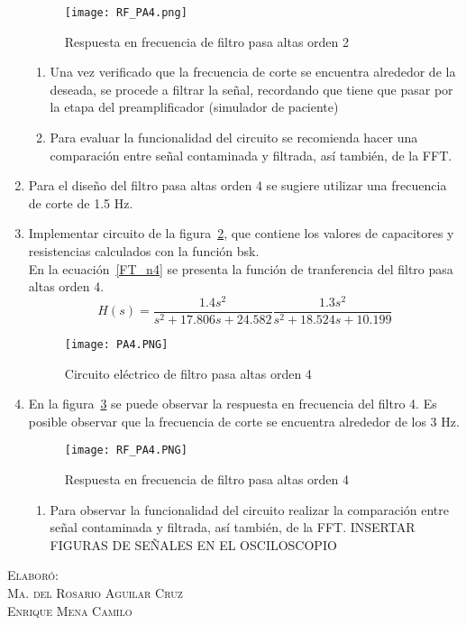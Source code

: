 \documentclass[10pt,letterpaper,spanish,twoside]{report}
\begin{document}
\begin{enumerate}
  \begin{figure}[H]
 	\centering
 	\texttt{[image: RF\_PA4.png]}
 	\caption{Respuesta en frecuencia de filtro pasa altas orden 2}
	\label{contexto:RF_2}
 \end{figure}
 \begin{enumerate}
  \item Una vez verificado que la frecuencia de corte se encuentra alrededor de la deseada, se procede a filtrar la señal, recordando que tiene que pasar por la etapa del preamplificador (simulador de paciente)
  \item Para evaluar la funcionalidad del circuito se recomienda hacer una comparación entre señal contaminada y filtrada, así también, de la FFT.
 \end{enumerate}  
 \item Para el diseño del filtro pasa altas orden 4 se sugiere utilizar una frecuencia de corte de 1.5 Hz.
 \item Implementar circuito de la figura~\ref{contexto:PA4}, que contiene los valores de capacitores y resistencias calculados con la función bsk.
 \\En la ecuación~\eqref{FT_n4} se presenta la función de tranferencia del filtro pasa altas orden 4.
 \begin{equation}
 	H(s)=\frac{1.4s^2}{s^2+17.806s+24.582} \frac{1.3s^2}{s^2+18.524s+10.199}\label{FT_n4}
 \end{equation}
 \begin{figure}[H]
 	\centering
 	\texttt{[image: PA4.PNG]}
 	\caption{Circuito eléctrico de filtro pasa altas orden 4}
	\label{contexto:PA4}
 \end{figure}
 \item En la figura~\ref{contexto:RF_4} se puede observar la respuesta en frecuencia del filtro 4. Es posible observar que la frecuencia de corte se encuentra alrededor de los 3 Hz.
 \begin{figure}
 	\centering
 	\texttt{[image: RF\_PA4.PNG]}
 	\caption{Respuesta en frecuencia de filtro pasa altas orden 4}
 	\label{contexto:RF_4}
 \end{figure}
 \begin{enumerate}
 	\item Para observar la funcionalidad del circuito realizar la comparación entre señal contaminada y filtrada, así también, de la FFT. INSERTAR FIGURAS DE SEÑALES EN EL OSCILOSCOPIO
 \end{enumerate}
\end{enumerate}


\vfill
\begin{flushright}
\textsc{Elaboró:\\
Ma. del Rosario Aguilar Cruz\\
Enrique Mena Camilo}
\end{flushright}
\end{document}
